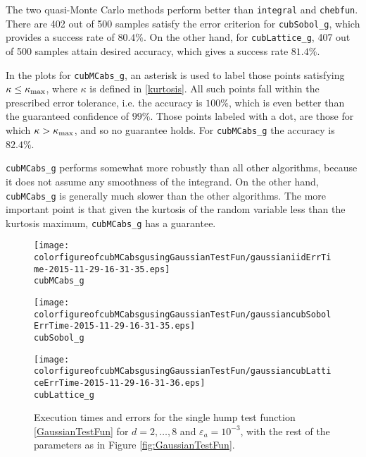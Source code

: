 \documentclass{iitthesis}
\theoremstyle{definition}
\begin{document}
The two quasi-Monte Carlo methods perform better than {\tt integral} and {\tt chebfun}. There are 402 out of 500 samples satisfy the error criterion for {\tt cubSobol\_g}, which provides a success rate of $80.4\%$. On the other hand, for {\tt cubLattice\_g}, 407 out of 500 samples attain desired accuracy, which gives a success rate $81.4\%$. 

In the plots for {\tt cubMCabs\_g}, an asterisk is used to label those points satisfying $\kappa \le \kappa_{\max}$, where $\kappa$ is defined in \eqref{kurtosis}. All such points fall within the prescribed error tolerance, i.e. the accuracy is $100\%$, which is even better than the guaranteed confidence of $99\%$.  Those points labeled with a dot, are those for which $\kappa > \kappa_{\max}$, and so no guarantee holds. For {\tt cubMCabs\_g} the accuracy is $82.4\%$.

 {\tt cubMCabs\_g} performs somewhat more robustly than all other algorithms, because it does not assume any smoothness of the integrand.  On the other hand, {\tt cubMCabs\_g} is generally much slower than the other algorithms. The more important point is that given the kurtosis of the random variable less than the kurtosis maximum, {\tt cubMCabs\_g} has a guarantee.
 
\begin{figure}
\centering
\begin{minipage}{9cm} \centering \texttt{[image: colorfigureofcubMCabsgusingGaussianTestFun/gaussianiidErrTime-2015-11-29-16-31-35.eps]} \\ {\tt cubMCabs\_g} \end{minipage}
\begin{minipage}{7cm} \centering \texttt{[image: colorfigureofcubMCabsgusingGaussianTestFun/gaussiancubSobolErrTime-2015-11-29-16-31-35.eps]} \\ {\tt cubSobol\_g} \end{minipage}
\begin{minipage}{7cm} \centering \texttt{[image: colorfigureofcubMCabsgusingGaussianTestFun/gaussiancubLatticeErrTime-2015-11-29-16-31-36.eps]} \\ {\tt cubLattice\_g} \end{minipage}
\caption{Execution times and errors for the single hump test function \eqref{GaussianTestFun} for $d=2, \ldots, 8$ and $\varepsilon_a=10^{-3}$, with the rest of the parameters as in Figure \ref{fig:GaussianTestFun}.\label{fig:GaussianTestFunHD}}
\end{figure}
\end{document}
